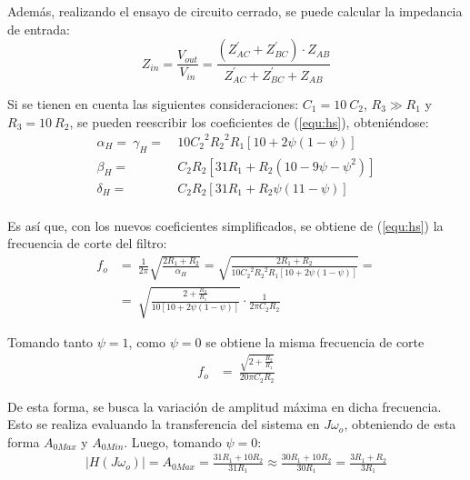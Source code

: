 \documentclass[a4paper]{article}
\begin{document}
Además, realizando el ensayo de circuito cerrado, se puede calcular la impedancia de entrada:
\begin{equation}
	Z_{in} = \frac{V_{out}}{V_{in}} = \frac{\left( Z_{AC}^{'} + Z_{BC}^{'} \right) \cdot Z_{AB}}{Z_{AC}^{'} + Z_{BC}^{'} + Z_{AB}}
	\label{equ:zin}
\end{equation}

Si se tienen en cuenta las siguientes consideraciones: $C_1 = 10 \ C_2$, $R_3 \gg R_1$ y $R_3 = 10 \ R_2$, se pueden reescribir los coeficientes de (\ref{equ:hs}), obteniéndose: 
\begin{equation}
\begin{split}
	\alpha_H =\ \gamma_H =\ & 10 {C_{2}}^{2} {R_{2}}^{2} R_{1} \left[ 10 + 2 \psi \left(1 - \psi \right) \right] \\
	\beta_H =\ & C_{2} R_{2} \left[ 31 R_1 + R_2 \left(10 - 9 \psi - \psi^2 \right) \right] \\
	\delta_H =\ & C_{2} R_{2} \left[ 31 R_1 + R_2 \psi \left(11 - \psi \right) \right] \\
\end{split}
\label{equ:simplifica}
\end{equation}

Es así que, con los nuevos coeficientes simplificados, se obtiene de (\ref{equ:hs}) la frecuencia de corte del filtro:
\begin{equation}
\begin{split}
	f_o &=\ \frac{1}{2 \pi} \sqrt{\frac{2R_1 + R_2}{\alpha_H}} = \sqrt{\frac{2R_1 + R_2}{10 {C_{2}}^{2} {R_{2}}^{2} R_{1} \left[ 10 + 2 \psi \left(1 - \psi \right) \right]}} = \\
	&=\ \sqrt{\frac{2 + \frac{R_2}{R_1}}{10 \left[ 10 + 2 \psi \left(1 - \psi \right) \right]}} \cdot \frac{1}{2 \pi C_2 R_2}
\end{split}
\label{equ:fosimp}
\end{equation}

Tomando tanto $\psi = 1$, como $\psi = 0$ se obtiene la misma frecuencia de corte
\begin{equation*}
\begin{split}
	f_o &=\ \frac{\sqrt{2 + \frac{R_2}{R_1}}}{20 \pi C_2 R_2}
\end{split}
\end{equation*}

De esta forma, se busca la variación de amplitud máxima en dicha frecuencia. Esto se realiza evaluando la transferencia del sistema en $J\omega_o$, obteniendo de esta forma $A_{0Max}$ y $A_{0Min}$. Luego, tomando $\psi = 0$:
\begin{equation*}
\begin{split}
|H\left(J\omega_o\right)| = A_{0Max} = \frac{31 R_{1} + 10 R_{2}}{31 R_{1}} \approx \frac{30 R_{1} + 10 R_{2}}{30 R_{1}} = \frac{3 R_{1} + R_{2}}{3 R_{1}}
\end{split}
\end{equation*}
\end{document}
